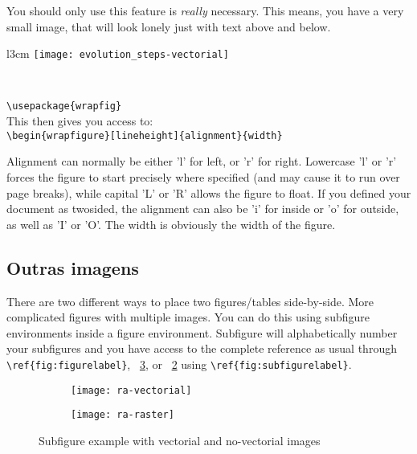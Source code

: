  You should only use this feature is \emph{really} necessary. This means, you have a very small image, that will look lonely just with text above and below.

 \begin{wrapfigure}{l}{3cm}
   \centering
     \texttt{[image: evolution\_steps-vectorial]}
   \caption{Vectorial image}\
 \end{wrapfigure}	
 
 \noindent\verb!\usepackage{wrapfig}!\\
 This then gives you access to:\\
 \verb!\begin{wrapfigure}[lineheight]{alignment}{width}!
 
 Alignment can normally be either 'l' for left, or 'r' for right. Lowercase 'l' or 'r' forces the figure to start precisely where specified (and may cause it to run over page breaks), while capital 'L' or 'R' allows the figure to float. If you defined your document as twosided, the alignment can also be 'i' for inside or 'o' for outside, as well as 'I' or 'O'. The width is obviously the width of the figure. 
 
 
\subsection{Outras imagens} %
\label{ssec:floats_figures_and_captions}

 
There are two different ways to place two figures/tables side-by-side.  More complicated figures with multiple images. You can do this using subfigure environments inside a figure environment. Subfigure will alphabetically number your subfigures and you have access to the complete reference as usual through \verb!\ref{fig:figurelabel}!, \figurename~\ref{fig:figura-completa}, or \figurename~\ref{fig:ra-raster} using \verb!\ref{fig:subfigurelabel}!.

\begin{figure}[htbp]
	\centering
    \begin{subfigure}[b]{0.35\textwidth}
    	\centering
		\texttt{[image: ra-vectorial]}
		\caption{}
		\label{fig:ra-vectorial}
     \end{subfigure}	
\qquad\qquad
 	\begin{subfigure}[b]{0.35\textwidth}
    	\centering
		\texttt{[image: ra-raster]}
		\caption{}
		\label{fig:ra-raster}
	\end{subfigure}		
  \caption{Subfigure example with vectorial and no-vectorial images}
  \label{fig:figura-completa}
\end{figure}


